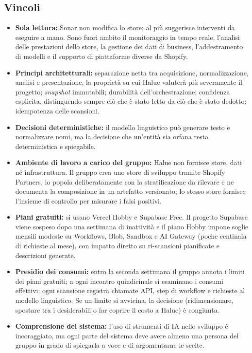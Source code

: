 \subsection{Vincoli}

\begin{itemize}
    \item \textbf{Sola lettura:} Sonar non modifica lo store; al più suggerisce interventi da eseguire a mano. Sono fuori ambito il monitoraggio in tempo reale, l'analisi delle prestazioni dello store, la gestione dei dati di business, l'addestramento di modelli e il supporto di piattaforme diverse da Shopify.
    \item \textbf{Principi architetturali:} separazione netta tra acquisizione, normalizzazione, analisi e presentazione, la proprietà su cui Halue valuterà più severamente il progetto; \emph{snapshot} immutabili; durabilità dell'orchestrazione; confidenza esplicita, distinguendo sempre ciò che è stato letto da ciò che è stato dedotto; idempotenza delle scansioni.
    \item \textbf{Decisioni deterministiche:} il modello linguistico può generare testo e normalizzare nomi, ma la decisione che un'entità sia orfana resta deterministica e spiegabile.
    \item \textbf{Ambiente di lavoro a carico del gruppo:} Halue non fornisce store, dati né infrastruttura. Il gruppo crea uno store di sviluppo tramite Shopify Partners, lo popola deliberatamente con la stratificazione da rilevare e ne documenta la composizione in un artefatto versionato; lo stesso store fornisce l'insieme di controllo per misurare i falsi positivi.
    \item \textbf{Piani gratuiti:} si usano Vercel Hobby e Supabase Free. Il progetto Supabase viene sospeso dopo una settimana di inattività e il piano Hobby impone soglie mensili modeste su Workflows, Blob, Sandbox e AI Gateway (poche centinaia di richieste al mese), con impatto diretto su ri-scansioni pianificate e descrizioni generate.
    \item \textbf{Presidio dei consumi:} entro la seconda settimana il gruppo annota i limiti dei piani gratuiti; a ogni incontro quindicinale si esaminano i consumi effettivi; ogni scansione registra chiamate API, step di workflow e richieste al modello linguistico. Se un limite si avvicina, la decisione (ridimensionare, spostare tra i desiderabili o far coprire il costo a Halue) è congiunta.
    \item \textbf{Comprensione del sistema:} l'uso di strumenti di IA nello sviluppo è incoraggiato, ma ogni parte del sistema deve avere almeno una persona del gruppo in grado di spiegarla a voce e di argomentarne le scelte.
\end{itemize}

